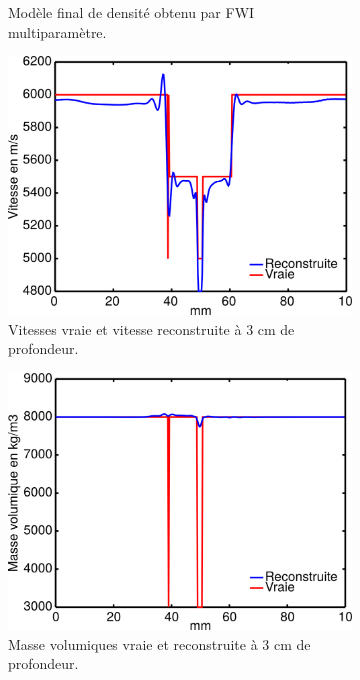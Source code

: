\begin{figure}[!h]
\begin{subfigure}[b]{0.45\textwidth}
		\caption{Modèle final de densité obtenu par FWI multiparamètre.}
	\end{subfigure}
	\begin{subfigure}[b]{0.45\textwidth}
		\includegraphics[width=\textwidth]{img/multi_param/coupe_vp_multi.png}
		\caption{Vitesses vraie et vitesse reconstruite à 3 cm de profondeur.}
	\end{subfigure}
	\begin{subfigure}[b]{0.45\textwidth}
		\includegraphics[width=\textwidth]{img/multi_param/coupe_rho_multi.png}
		\caption{Masse volumiques vraie et reconstruite à 3 cm de profondeur.}
	\end{subfigure}
	\caption{\label{app:inv_multi} }
\end{figure}


